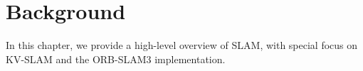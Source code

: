\section{Background}
\label{sec:background}

In this chapter, we provide a high-level overview of SLAM, with special focus on KV-SLAM and the ORB-SLAM3 implementation.



